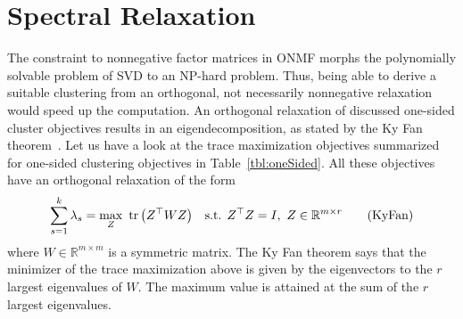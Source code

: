 \section{Spectral Relaxation}\label{sec:ZS:SpectralRelaxation}
The constraint to nonnegative factor matrices in ONMF morphs the polynomially solvable problem of SVD to an NP-hard problem. Thus, being able to derive a suitable clustering from an orthogonal, not necessarily nonnegative relaxation would speed up the computation.
An orthogonal relaxation of discussed one-sided cluster objectives results in an eigendecomposition, as stated by the Ky Fan theorem~\citep{fan1949theorem}. Let us have a look at the trace maximization objectives summarized for one-sided clustering objectives in Table~\ref{tbl:oneSided}. All these objectives have an orthogonal relaxation of the form 
\begin{align}
\sum_{s=1}^k\lambda_s = \max_Z&\ \operatorname*{tr}\left(Z^\top W Z\right) & \text{s.t. } Z^\top Z = I,\  Z\in\mathbb{R}^{m\times r} \label{eq:kyFan} \tag{KyFan}
\end{align}
where $W\in \mathbb{R}^{m\times m}$ is a symmetric matrix. The Ky Fan theorem says that the minimizer of the trace maximization above is given by the eigenvectors to the $r$ largest eigenvalues of $W$. The maximum value is attained at the sum of the $r$ largest eigenvalues. 


